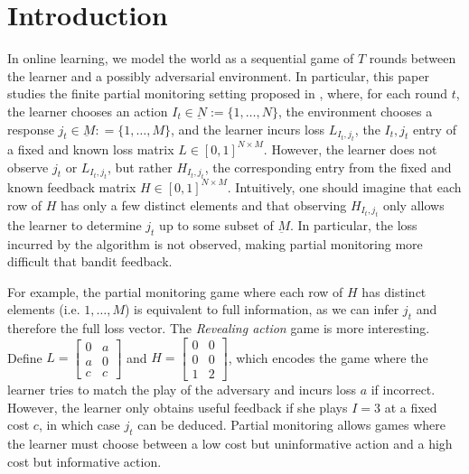 \documentclass{article}
\begin{document}
\section{Introduction}
In online learning, we model the world as a sequential game of $T$ rounds between the learner and a possibly adversarial environment. In particular, this paper studies the finite partial monitoring setting proposed in \cite{piccolboni2001discrete}, where, for each round $t$, the learner chooses an action $I_t \in \underbar N := \{1,\ldots,N\}$, the environment chooses a response $j_t \in \underbar M: = \{1,\ldots,M\}$, and the learner incurs loss $L_{I_t,j_t}$, the $I_t,j_t$ entry of a fixed and known loss matrix $L\in[0,1]^{N\times M}$. However, the learner does not observe $j_t$ or $L_{I_t,j_t}$, but rather $H_{I_t,j_t}$, the corresponding entry from the fixed and known feedback matrix $H\in[0,1]^{N\times M}$. Intuitively, one should imagine that each row of $H$ has only a few distinct elements and that observing $H_{I_t,j_t}$ only allows the learner to determine $j_t$ up to some subset of $\underbar M$. In particular, the loss incurred by the algorithm is not observed, making partial monitoring more difficult that bandit feedback.

For example, the partial monitoring game where each row of $H$ has distinct elements (i.e. $1,\ldots,M$) is equivalent to full information, as we can infer $j_t$ and therefore the full loss vector. The \textit{Revealing action} game is more interesting. Define
  $L = \begin{bmatrix}
    0 & a\\
    a & 0\\
    c & c
  \end{bmatrix}$
  and
  $H = \begin{bmatrix}
    0 & 0\\
    0 & 0\\
    1 & 2
  \end{bmatrix}$,
  which encodes the game where the learner tries to match the play of the adversary and incurs loss $a$ if incorrect. However, the learner only obtains useful feedback if she plays $I=3$ at a fixed cost $c$, in which case $j_t$ can be deduced. Partial monitoring allows games where the learner must choose between a low cost but uninformative action and a high cost but informative action.
\end{document}
